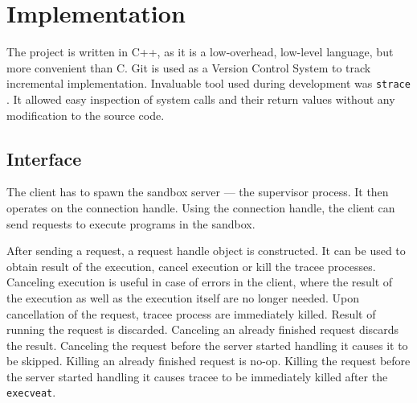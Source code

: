 \documentclass[en]{pracamgr}
\begin{document}
\chapter{Implementation}\label{chapter:implementation}

The project is written in C++, as it is a low-overhead, low-level language, but more convenient than C. Git is used as a Version Control System to track incremental implementation. Invaluable tool used during development was \texttt{strace} \cite{strace}. It allowed easy inspection of system calls and their return values without any modification to the source code.

\section{Interface}

The client has to spawn the sandbox server --- the supervisor process. It then operates on the connection handle. Using the connection handle, the client can send requests to execute programs in the sandbox.

After sending a request, a request handle object is constructed. It can be used to obtain result of the execution, cancel execution or kill the tracee processes. Canceling execution is useful in case of errors in the client, where the result of the execution as well as the execution itself are no longer needed. Upon cancellation of the request, tracee process are immediately killed. Result of running the request is discarded. Canceling an already finished request discards the result. Canceling the request before the server started handling it causes it to be skipped. Killing an already finished request is no-op. Killing the request before the server started handling it causes tracee to be immediately killed after the \texttt{execveat}.
\end{document}
